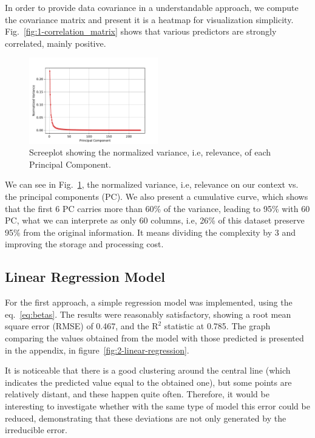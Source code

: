 In order to provide data covariance in a understandable approach, we compute the covariance matrix and present it is a heatmap for visualization simplicity. Fig.~\ref{fig:1-correlation_matrix} shows that various predictors are strongly correlated, mainly positive.

\begin{figure}[htbp!]
  \centerline{\includegraphics[width=0.50\textwidth]{../../code/hw2/figures/0-PCA-screeplot.pdf}}
  \caption{Screeplot showing the normalized variance, i.e, relevance, of each Principal Component.}
  \label{fig:0-PCA-screeplot}
\end{figure}

We can see in Fig.~\ref{fig:0-PCA-screeplot}, the normalized variance, i.e, relevance on our context vs. the principal components (PC). We also present a cumulative curve, which shows that the first 6 PC carries more than 60\% of the variance, leading to 95\% with 60 PC, what we can interprete as only 60 columns, i.e, 26\% of this dataset preserve 95\% from the original information. It means dividing the complexity by 3 and improving the storage and processing cost.

\subsection{Linear Regression Model}
For the first approach, a simple regression model was implemented, using the eq.~\ref{eq:betas}. The results were reasonably satisfactory, showing a root mean square error (RMSE) of 0.467, and the $\text{R}^2$ statistic at 0.785. The graph comparing the values obtained from the model with those predicted is presented in the appendix, in figure~\ref{fig:2-linear-regression}. 

It is noticeable that there is a good clustering around the central line (which indicates the predicted value equal to the obtained one), but some points are relatively distant, and these happen quite often. Therefore, it would be interesting to investigate whether with the same type of model this error could be reduced, demonstrating that these deviations are not only generated by the irreducible error.

